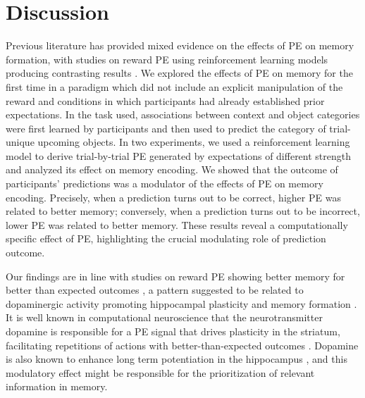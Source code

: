 \documentclass[a4paper,12pt]{article}
\begin{document}

 
\section{Discussion}
Previous literature has provided mixed evidence on the effects of PE on memory formation, with studies on reward PE using reinforcement learning models producing contrasting results \citep{Jang2019, de2018signed,Rouhani2018, Rouhani2021}. We explored the effects of PE on memory for the first time in a paradigm which did not include an explicit manipulation of the reward and conditions in which participants had already established prior expectations. In the task used, associations between context and object categories were first learned by participants and then used to predict the category of trial-unique upcoming objects. In two experiments, we used a reinforcement learning model to derive trial-by-trial PE generated by expectations of different strength and analyzed its effect on memory encoding. We showed that the outcome of participants' predictions was a modulator of the effects of PE on memory encoding. Precisely, when a prediction turns out to be correct, higher PE was related to better memory; conversely, when a prediction turns out to be incorrect, lower PE was related to better memory. These results reveal a computationally specific effect of PE, highlighting the crucial modulating role of prediction outcome. \par
Our findings are in line with studies on reward PE showing better memory for better than expected outcomes \citep{de2018signed, Jang2019},
a pattern suggested to be related to dopaminergic activity promoting hippocampal plasticity and memory formation \citep{Bethus2010,rosen2015midbrain}. It is well known in computational neuroscience that the neurotransmitter dopamine is responsible for a PE signal that drives plasticity in the striatum, facilitating repetitions of actions with better-than-expected outcomes \citep{Daw2013, Niv2008}. Dopamine is also known to enhance long term potentiation in the hippocampus \citep{lemon2006dopamine}, and this modulatory effect might be responsible for the prioritization of relevant information in memory. \par 
\end{document}
